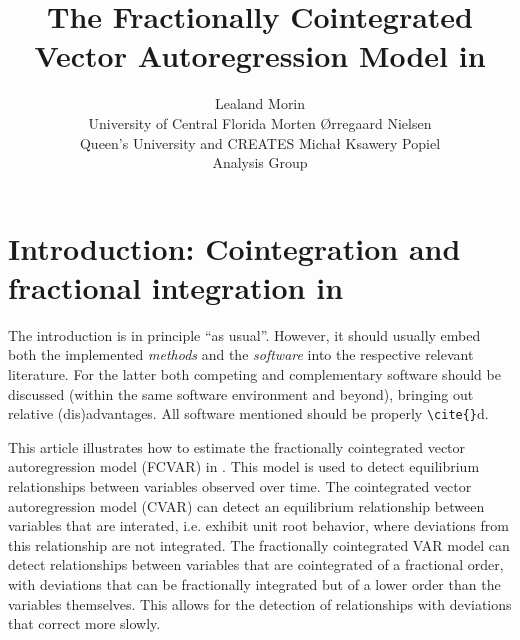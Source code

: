 \documentclass[article]{jss}
\author{Lealand Morin\\University of Central Florida
   \And Morten \O rregaard Nielsen\\Queen's University and CREATES
   \AND Micha\l{} Ksawery Popiel\\Analysis Group}
\title{The Fractionally Cointegrated Vector Autoregression Model in \proglang{R}}
\begin{document}


\section[Introduction: Cointegration and fractional integration in R]{Introduction: Cointegration and fractional integration in } \label{sec:intro}

\begin{leftbar}
The introduction is in principle ``as usual''. However, it should usually embed
both the implemented \emph{methods} and the \emph{software} into the respective
relevant literature. For the latter both competing and complementary software
should be discussed (within the same software environment and beyond), bringing
out relative (dis)advantages. All software mentioned should be properly
\verb|\cite{}|d. 
%
\end{leftbar}


This article illustrates how to estimate 
  the fractionally cointegrated vector autoregression model (FCVAR) in . 
  This model is used to detect equilibrium relationships between variables observed over time. 
  The cointegrated vector autoregression model (CVAR) can detect an equilibrium relationship between variables that are interated, i.e. exhibit unit root behavior, where deviations from this relationship are not integrated. 
  The fractionally cointegrated VAR model can detect relationships between variables that are cointegrated of a fractional order, with deviations that can be fractionally integrated but of a lower order than the variables themselves. 
  This allows for the detection of relationships with deviations that correct more slowly. 
\end{document}
